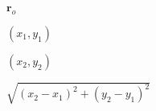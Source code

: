 \documentclass{article}
\begin{document}
$\mathbf{r}_o$
\pagebreak

$(x_1,y_1)$
\pagebreak

$(x_2,y_2)$
\pagebreak

$\sqrt { (x_2 - x_1) ^ 2 + (y_2 - y_1) ^ 2 } $
\pagebreak
\end{document}
